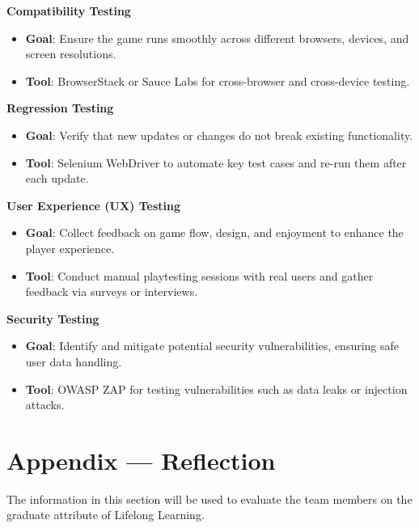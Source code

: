 \documentclass[12pt, titlepage]{article}
\begin{document}
\textbf{Compatibility Testing}
\begin{itemize}
    \item \textbf{Goal}: Ensure the game runs smoothly across different browsers, devices, and screen resolutions.
    \item \textbf{Tool}: BrowserStack or Sauce Labs for cross-browser and cross-device testing.
\end{itemize}

\textbf{Regression Testing}
\begin{itemize}
    \item \textbf{Goal}: Verify that new updates or changes do not break existing functionality.
    \item \textbf{Tool}: Selenium WebDriver to automate key test cases and re-run them after each update.
\end{itemize}

\textbf{User Experience (UX) Testing}
\begin{itemize}
    \item \textbf{Goal}: Collect feedback on game flow, design, and enjoyment to enhance the player experience.
    \item \textbf{Tool}: Conduct manual playtesting sessions with real users and gather feedback via surveys or interviews.
\end{itemize}

\textbf{Security Testing}
\begin{itemize}
    \item \textbf{Goal}: Identify and mitigate potential security vulnerabilities, ensuring safe user data handling.
    \item \textbf{Tool}: OWASP ZAP for testing vulnerabilities such as data leaks or injection attacks.
\end{itemize}

\section*{Appendix --- Reflection}
The information in this section will be used to evaluate the team members on the graduate attribute of Lifelong Learning.
\end{document}
